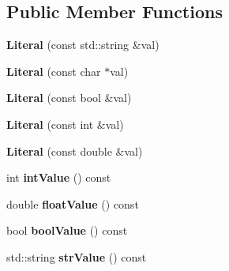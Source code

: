 \subsection*{Public Member Functions}
\begin{DoxyCompactItemize}
\item 
\hypertarget{classcfg_1_1Literal_aa7cad9d482f1d3e3305ebf2b9c6f7fb8}{{\bfseries Literal} (const std\-::string \&val)}\label{classcfg_1_1Literal_aa7cad9d482f1d3e3305ebf2b9c6f7fb8}

\item 
\hypertarget{classcfg_1_1Literal_a782ec89368c83260aaea88beef8e2bf3}{{\bfseries Literal} (const char $\ast$val)}\label{classcfg_1_1Literal_a782ec89368c83260aaea88beef8e2bf3}

\item 
\hypertarget{classcfg_1_1Literal_af50021adc4cabcbf3d87c96773d57142}{{\bfseries Literal} (const bool \&val)}\label{classcfg_1_1Literal_af50021adc4cabcbf3d87c96773d57142}

\item 
\hypertarget{classcfg_1_1Literal_aa8dc2b15898296b460be0bc9f7b31ed8}{{\bfseries Literal} (const int \&val)}\label{classcfg_1_1Literal_aa8dc2b15898296b460be0bc9f7b31ed8}

\item 
\hypertarget{classcfg_1_1Literal_ae855b8792337ad3fa641d276919942e0}{{\bfseries Literal} (const double \&val)}\label{classcfg_1_1Literal_ae855b8792337ad3fa641d276919942e0}

\item 
\hypertarget{classcfg_1_1Literal_a472dcebeedef7f35824aa3cbedfb5215}{int {\bfseries int\-Value} () const }\label{classcfg_1_1Literal_a472dcebeedef7f35824aa3cbedfb5215}

\item 
\hypertarget{classcfg_1_1Literal_a294e05f6f50e6802525f0de6e0efe4c3}{double {\bfseries float\-Value} () const }\label{classcfg_1_1Literal_a294e05f6f50e6802525f0de6e0efe4c3}

\item 
\hypertarget{classcfg_1_1Literal_aaf4fada4fef3fd70f53da9c0a29155d4}{bool {\bfseries bool\-Value} () const }\label{classcfg_1_1Literal_aaf4fada4fef3fd70f53da9c0a29155d4}

\item 
\hypertarget{classcfg_1_1Literal_a59e6d0702d22b25a018d3465dc9aea4b}{std\-::string {\bfseries str\-Value} () const }\label{classcfg_1_1Literal_a59e6d0702d22b25a018d3465dc9aea4b}


\end{DoxyCompactItemize}
